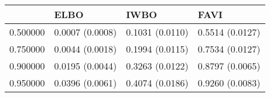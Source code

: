 \begin{tabular}{llll}
\toprule
 & ELBO & IWBO & FAVI \\
\midrule
0.500000 & 0.0007 (0.0008) & 0.1031 (0.0110) & 0.5514 (0.0127) \\
0.750000 & 0.0044 (0.0018) & 0.1994 (0.0115) & 0.7534 (0.0127) \\
0.900000 & 0.0195 (0.0044) & 0.3263 (0.0122) & 0.8797 (0.0065) \\
0.950000 & 0.0396 (0.0061) & 0.4074 (0.0186) & 0.9260 (0.0083) \\
\bottomrule
\end{tabular}
